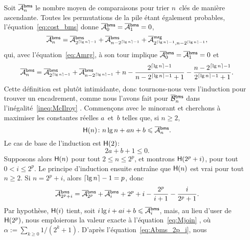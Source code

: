 Soit \(\OM{\fun{bms}}{n}\) le nombre moyen de comparaisons pour trier
\(n\)~clés de manière ascendante. Toutes les permutations de la pile
étant également probables, l'équation~\eqref{eq:cost_bms}
 donne \(\OM{\fun{bms}}{0} = \OM{\fun{bms}}{1}
= 0\),
\begin{equation*}
\OM{\fun{bms}}{n} = \OM{\fun{bms}}{2^{\ceiling{\lg n}-1}}
+ \OM{\fun{bms}}{n - 2^{\ceiling{\lg n}-1}}
+ \OM{\fun{mrg}}{2^{\ceiling{\lg n}-1},n - 2^{\ceiling{\lg n}-1}},
\end{equation*}
qui, avec l'équation~\eqref{eq:Amrg}, à son tour implique
\(\OM{\fun{bms}}{0} = \OM{\fun{bms}}{1} = 0\) et
\begin{equation*}
\OM{\fun{bms}}{n} = \OM{\fun{bms}}{2^{\ceiling{\lg n}-1}}
+ \OM{\fun{bms}}{n - 2^{\ceiling{\lg n}-1}}
+ n - \frac{2^{\ceiling{\lg n}-1}}{n - 2^{\ceiling{\lg n}-1} + 1}
- \frac{n - 2^{\ceiling{\lg n}-1}}{2^{\ceiling{\lg n}-1}+1}.
\end{equation*}
Cette définition est plutôt intimidante, donc tournons-nous vers
l'induction pour trouver un encadrement, comme nous l'avons fait pour
\(\OB{\fun{tms}}{n}\) dans l'inégalité~\eqref{ineq:McIlroy}
. Commençons avec le minorant et cherchons à
maximiser les constantes réelles \(a\)~et~\(b\) telles que, si \(n \geqslant 2\),
\begin{equation*}
\pred{H}{n} \colon n\lg n + an + b \leqslant \OM{\fun{bms}}{n}.
\end{equation*}
Le cas de base de l'induction est \(\textsf{H}({2})\):
\begin{equation}
2a + b + 1 \leqslant 0.
\label{ineq:base_lower_Btms}
\end{equation}
Supposons alors \(\textsf{H}({n})\) pour tout \(2 \leqslant n \leqslant
2^p\), et montrons \(\textsf{H}({2^p+i})\), pour tout \(0 < i \leqslant
2^p\). Le principe d'induction ensuite entraîne que \(\textsf{H}({n})\)
est vrai pour tout \(n \geqslant 2\). Si \(n=2^p+i\), alors
\(\lceil{\lg n}\rceil - 1 = p\), donc
\begin{equation}
\OM{\fun{bms}}{2^p+i} = \OM{\fun{bms}}{2^p} + \OM{\fun{bms}}{i}
+ 2^p + i - \frac{2^p}{i+1} - \frac{i}{2^p+1}.
\label{eq:Abms_2p_i}
\end{equation}
Par hypothèse, \(\textsf{H}({i})\) tient, soit \(i\lg i + ai + b \leqslant
\OM{\fun{bms}}{i}\), mais, au lieu d'user de \(\textsf{H}({2^p})\), nous
emploierons la valeur exacte à l'équation~\eqref{eq:Mjoin}
, où \(\alpha := \sum_{k \geqslant
  0}1/(2^k+1)\). D'après l'équation~\eqref{eq:Abms_2p_i}, nous
